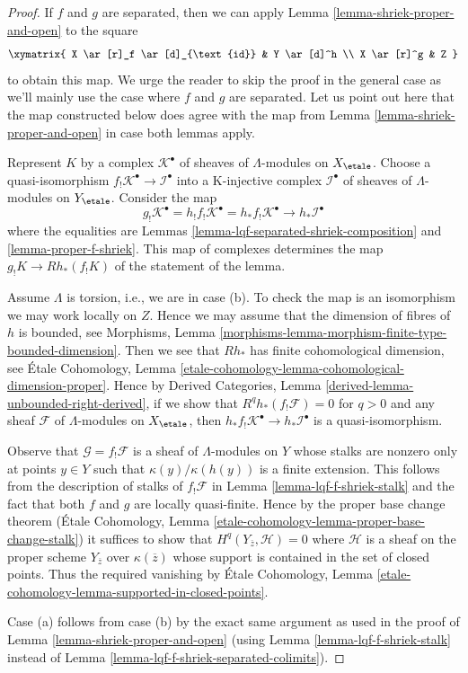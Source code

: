 \begin{proof}
If $f$ and $g$ are separated, then we can apply
Lemma \ref{lemma-shriek-proper-and-open} to the square
$$
\xymatrix{
X \ar[r]_f \ar[d]_{\text{id}} & Y \ar[d]^h \\
X \ar[r]^g & Z
}
$$
to obtain this map. We urge the reader to skip the proof in the general case
as we'll mainly use the case where $f$ and $g$ are separated. Let us
point out here that the map constructed below does agree with the map
from Lemma \ref{lemma-shriek-proper-and-open} in case both lemmas apply.

\medskip\noindent
Represent $K$ by a complex $\mathcal{K}^\bullet$ of sheaves of
$\Lambda$-modules on $X_\etale$. Choose a quasi-isomorphism
$f_!\mathcal{K}^\bullet \to \mathcal{I}^\bullet$ into a K-injective
complex $\mathcal{I}^\bullet$ of sheaves of $\Lambda$-modules on $Y_\etale$.
Consider the map
$$
g_!\mathcal{K}^\bullet =
h_!f_!\mathcal{K}^\bullet =
h_*f_!\mathcal{K}^\bullet
\longrightarrow
h_*\mathcal{I}^\bullet
$$
where the equalities are
Lemmas \ref{lemma-lqf-separated-shriek-composition}
and \ref{lemma-proper-f-shriek}. This map of complexes determines the map
$g_!K \to Rh_*(f_!K)$ of the statement of the lemma.

\medskip\noindent
Assume $\Lambda$ is torsion, i.e., we are in case (b). To check the map
is an isomorphism we may work locally on $Z$.
Hence we may assume that the dimension of fibres of $h$ is bounded,
see Morphisms, Lemma
\ref{morphisms-lemma-morphism-finite-type-bounded-dimension}.
Then we see that $Rh_*$ has finite cohomological dimension, see
\'Etale Cohomology, Lemma
\ref{etale-cohomology-lemma-cohomological-dimension-proper}.
Hence by Derived Categories, Lemma \ref{derived-lemma-unbounded-right-derived},
if we show that $R^qh_*(f_!\mathcal{F}) = 0$ for $q > 0$
and any sheaf $\mathcal{F}$ of $\Lambda$-modules on $X_\etale$, then
$h_*f_!\mathcal{K}^\bullet \to h_*\mathcal{I}^\bullet$ is a quasi-isomorphism.

\medskip\noindent
Observe that $\mathcal{G} = f_!\mathcal{F}$ is a sheaf of $\Lambda$-modules
on $Y$ whose stalks are nonzero only at points $y \in Y$ such that
$\kappa(y)/\kappa(h(y))$ is a finite extension. This follows from the
description of stalks of $f_!\mathcal{F}$ in
Lemma \ref{lemma-lqf-f-shriek-stalk}
and the fact that both $f$ and $g$ are locally quasi-finite.
Hence by the proper base change theorem (\'Etale Cohomology, Lemma
\ref{etale-cohomology-lemma-proper-base-change-stalk})
it suffices to show that $H^q(Y_{\overline{z}}, \mathcal{H}) = 0$
where $\mathcal{H}$ is a sheaf on the proper scheme $Y_{\overline{z}}$
over $\kappa(\overline{z})$ whose support is contained in the set
of closed points. Thus the required vanishing by \'Etale Cohomology, Lemma
\ref{etale-cohomology-lemma-supported-in-closed-points}.

\medskip\noindent
Case (a) follows from case (b) by the exact same argument as used
in the proof of Lemma \ref{lemma-shriek-proper-and-open}
(using Lemma \ref{lemma-lqf-f-shriek-stalk} instead of
Lemma \ref{lemma-lqf-f-shriek-separated-colimits}).
\end{proof}

